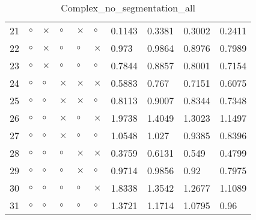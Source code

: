 \begin{table}[H]
\begin{tabular}{|P{0.7cm}|P{1.3cm}P{1.3cm}P{1.3cm}P{1.3cm}P{1.3cm}|P{1.1cm}P{1.1cm}P{1.1cm}P{1.1cm}|}
  21 &  $\circ$ & $\times$ &  $\circ$ & $\times$ &     $\circ$ &          0.1143 &         0.3381 &          0.3002 &          0.2411 \\
  22 &  $\circ$ & $\times$ &  $\circ$ &  $\circ$ &    $\times$ &           0.973 &         0.9864 &          0.8976 &          0.7989 \\
  23 &  $\circ$ & $\times$ &  $\circ$ &  $\circ$ &     $\circ$ &          0.7844 &         0.8857 &          0.8001 &          0.7154 \\
  24 &  $\circ$ &  $\circ$ & $\times$ & $\times$ &    $\times$ &          0.5883 &          0.767 &          0.7151 &          0.6075 \\
  25 &  $\circ$ &  $\circ$ & $\times$ & $\times$ &     $\circ$ &          0.8113 &         0.9007 &          0.8344 &          0.7348 \\
  26 &  $\circ$ &  $\circ$ & $\times$ &  $\circ$ &    $\times$ &          1.9738 &         1.4049 &          1.3023 &          1.1497 \\
  27 &  $\circ$ &  $\circ$ & $\times$ &  $\circ$ &     $\circ$ &          1.0548 &          1.027 &          0.9385 &          0.8396 \\
  28 &  $\circ$ &  $\circ$ &  $\circ$ & $\times$ &    $\times$ &          0.3759 &         0.6131 &           0.549 &          0.4799 \\
  29 &  $\circ$ &  $\circ$ &  $\circ$ & $\times$ &     $\circ$ &          0.9714 &         0.9856 &            0.92 &          0.7975 \\
  30 &  $\circ$ &  $\circ$ &  $\circ$ &  $\circ$ &    $\times$ &          1.8338 &         1.3542 &          1.2677 &          1.1089 \\
  31 &  $\circ$ &  $\circ$ &  $\circ$ &  $\circ$ &     $\circ$ &          1.3721 &         1.1714 &          1.0795 &            0.96 \\
\hline
\end{tabular}
\caption{Complex_no_segmentation_all}
\label{tab:}
\end{table}

